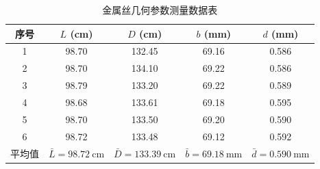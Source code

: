 \documentclass{../../templates/Report}%
\begin{document}
\begin{fullreportonly}
    \begin{table}[H]
        \centering
        \caption{金属丝几何参数测量数据表}
        \begin{tabular}{ccccc}
            \toprule
            序号  & $L$ (\si{\centi\meter})              & $D$ (\si{\centi\meter})               & $b$ (\si{\milli\meter})              & $d$ (\si{\milli\meter})              \\
            \midrule
            1   & 98.70                                & 132.45                                & 69.16                                & 0.586                                \\
            2   & 98.70                                & 134.10                                & 69.22                                & 0.586                                \\
            3   & 98.79                                & 133.20                                & 69.22                                & 0.589                                \\
            4   & 98.68                                & 133.61                                & 69.18                                & 0.595                                \\
            5   & 98.70                                & 133.50                                & 69.20                                & 0.590                                \\
            6   & 98.72                                & 133.48                                & 69.12                                & 0.592                                \\
            \midrule
            平均值 & $\bar{L} = \SI{98.72}{\centi\meter}$ & $\bar{D} = \SI{133.39}{\centi\meter}$ & $\bar{b} = \SI{69.18}{\milli\meter}$ & $\bar{d} = \SI{0.590}{\milli\meter}$ \\
            \bottomrule
        \end{tabular}
    \end{table}


\end{fullreportonly}
\end{document}
